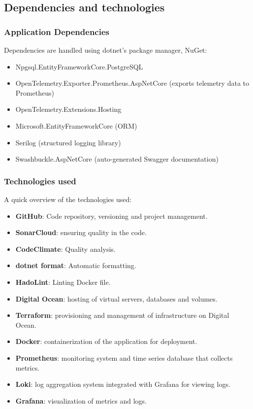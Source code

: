 
\subsection{Dependencies and technologies}
\subsubsection{Application Dependencies}
Dependencies are handled using dotnet's package manager, NuGet:
\begin{itemize}
    \item Npgsql.EntityFrameworkCore.PostgreSQL 
    \item OpenTelemetry.Exporter.Prometheus.AspNetCore (exports telemetry data to Prometheus)
    \item OpenTelemetry.Extensions.Hosting
    \item Microsoft.EntityFrameworkCore (ORM)
    \item Serilog (structured logging library)
    \item Swashbuckle.AspNetCore (auto-generated Swagger documentation)
\end{itemize}

\subsubsection{Technologies used}
A quick overview of the technologies used:
\begin{itemize}
    \item \textbf{GitHub}: Code repository, versioning and project management.
    \item \textbf{SonarCloud}: ensuring quality in the code.
    \item \textbf{CodeClimate}: Quality analysis.
    \item \textbf{dotnet format}: Automatic formatting.
    \item \textbf{HadoLint}: Linting Docker file.
    \item \textbf{Digital Ocean}: hosting of virtual servers, databases and volumes.
    \item \textbf{Terraform}: provisioning and management of infrastructure on Digital Ocean.
    \item \textbf{Docker}: containerization of the application for deployment.
    \item \textbf{Prometheus}: monitoring system and time series database that collects metrics.
    \item \textbf{Loki}: log aggregation system integrated with Grafana for viewing logs.
    \item \textbf{Grafana}: visualization of metrics and logs.
\end{itemize} 

